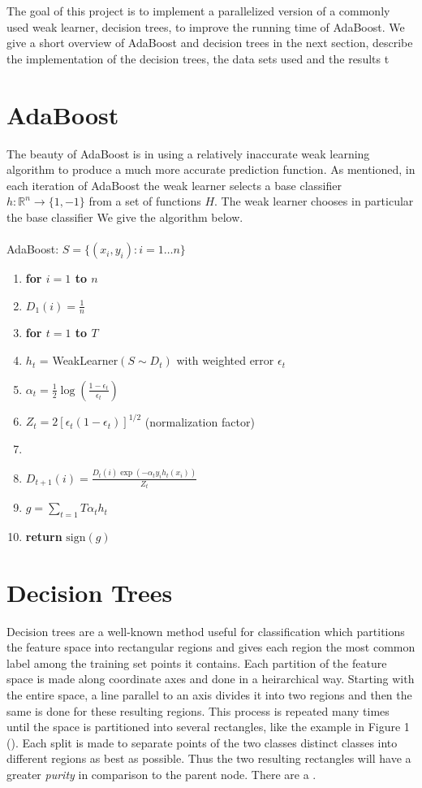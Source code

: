 \documentclass[12pt]{article}
\begin{document}
The goal of this project is to implement a parallelized version of a commonly used weak learner, decision trees, to improve the running time of AdaBoost. We give a short overview of AdaBoost and decision trees in the next section, describe the implementation of the decision trees, the data sets used and the results t 

\section{AdaBoost}
The beauty of AdaBoost is in using a relatively inaccurate weak learning algorithm to produce a much more accurate prediction function. As mentioned, in each iteration of AdaBoost the weak learner selects a base classifier $h: \mathbb{R}^n\rightarrow\{1,-1\}$ from a set of functions $H$. The weak learner chooses in particular the base classifier  We give the algorithm below.\\
\\
{\sc AdaBoost}: $S = \{(x_i,y_i):i = 1\ldots n\}$
\begin{enumerate}
\itemsep1pt \parskip0pt 
\item {\bf for $i=1$ to $n$}
\item \quad $D_1(i) = \frac{1}{n}$
\item {\bf for $t=1$ to $T$}
\item \quad $h_t$ = {\sc WeakLearner}$(S\sim D_t)$ with weighted error $\epsilon_t$
\item \quad $\alpha_t = \frac{1}{2}\log(\frac{1-\epsilon_t}{\epsilon_t})$
\item \quad $Z_t = 2[\epsilon_t(1-\epsilon_t)]^{1/2}$ (normalization factor)
\item {}
\item \quad \quad $D_{t+1}(i) = \frac{D_t(i)\exp(-\alpha_t y_i h_t(x_i))}{Z_t}$
\item $g = \sum_{t=1}{T} \alpha_t h_t$
\item {\bf return} $\mbox{sign}(g)$
\end{enumerate}



\section{Decision Trees}
Decision trees are a well-known method useful for classification which
partitions the feature space into rectangular regions and gives each region the
most common label among the training set points it contains. Each partition of
the feature space is made along coordinate axes and done in a heirarchical way.
Starting with the entire space, a line parallel to an axis divides it into two
regions and then the same is done for these resulting regions. This process is
repeated many times until the space is partitioned into several rectangles,
like the example in Figure 1 (\cite{HTF}). Each split is made to separate points of the two classes distinct classes into different regions as best as possible. Thus the two resulting rectangles will have a greater {\it purity} in comparison to the parent node. There are a .
\end{document}
